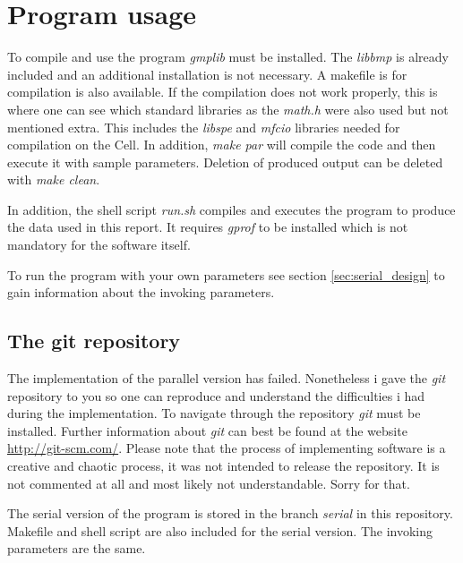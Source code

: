 \section{Program usage}
\label{sec:usage}

To compile and use the program \emph{gmplib} must be installed. The \emph{libbmp} is already included and an additional installation is not necessary. A makefile is for compilation is also available. If the compilation does not work properly, this is where one can see which standard libraries as the \emph{math.h} were also used but not mentioned extra. This includes the \emph{libspe} and \emph{mfcio} libraries needed for compilation on the Cell. In addition, \emph{make par} will compile the code and then execute it with sample parameters. Deletion of produced output can be deleted with \emph{make clean}.

In addition, the shell script \emph{run.sh} compiles and executes the program to produce the data used in this report. It requires \emph{gprof} to be installed which is not mandatory for the software itself.

To run the program with your own parameters see section \ref{sec:serial_design} to gain information about the invoking parameters.

\subsection{The git repository}
The implementation of the parallel version has failed. Nonetheless i gave the \emph{git} repository to you so one can reproduce and understand the difficulties i had during the implementation. To navigate through the repository \emph{git} must be installed. Further information about \emph{git} can best be found at the website \url{http://git-scm.com/}.
Please note that the process of implementing software is a creative and chaotic process, it was not intended to release the repository. It is not commented at all and most likely not understandable. Sorry for that.

The serial version of the program is stored in the branch \emph{serial} in this repository. Makefile and shell script are also included for the serial version. The invoking parameters are the same. 


